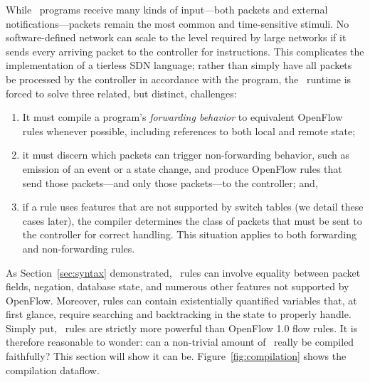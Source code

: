 While \flowlog\ programs receive many kinds of input---both packets and
external notifications---packets remain the most common and time-sensitive
stimuli.  No software-defined network can scale to the level required by large
networks if it sends every arriving packet to the controller for instructions.
This complicates the implementation of a tierless SDN language; rather than
simply have all packets be processed by the controller in accordance with the
program, the \flowlog\ runtime is forced to solve three related, but distinct, 
challenges:

\begin{enumerate} 

\item{It must compile a program's \emph{forwarding behavior} to
equivalent OpenFlow~\cite{McKeown:ccr08-openflow} rules whenever possible,
including references to both local and remote state;}

\item{it must discern which packets can trigger non-forwarding
behavior, such as emission of an event or a state change, and produce
OpenFlow rules that send those packets---and only those packets---to the
controller; and,}

\item{if a rule uses features that are not supported by switch tables (we
detail these cases later), the compiler determines the class of packets
that must be sent to the controller for correct handling.
This situation applies to both
forwarding and non-forwarding rules.}

\end{enumerate}
As Section~\ref{sec:syntax} demonstrated, \flowlog\ rules can
involve equality between packet fields, negation, database state, and
numerous other features not supported by OpenFlow. Moreover, rules
can contain existentially quantified variables that, at first glance, require
searching and backtracking in the state to properly handle. Simply put,
\flowlog\ rules are strictly more powerful than OpenFlow 1.0 flow rules. It is
therefore reasonable to wonder: can a non-trivial amount of \flowlog\ really
be compiled faithfully? This section will show it can be.
Figure~\ref{fig:compilation} shows the compilation dataflow.

